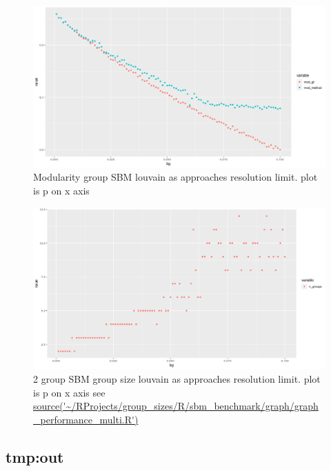 \begin{figure}
    \centering
    \includegraphics[width=\textwidth]{images/Rplot_rough_modularity_lou_ground_truth.png}
    \caption{Modularity group SBM louvain as approaches resolution limit. plot is p on x axis}
    \label{fig:my_rough_louvain modularity}
\end{figure}


\begin{figure}
    \centering
    \includegraphics[width=\textwidth]{images/Rplot_group_size_rough_louvain_sbm.png}
    \caption{2 group SBM group size louvain as approaches resolution limit. plot is p on x axis see \url{source('~/RProjects/group_sizes/R/sbm_benchmark/graph/graph_performance_multi.R')}}
    \label{fig:my_rough_louvain group size}
\end{figure}


\subsection{tmp:out}
